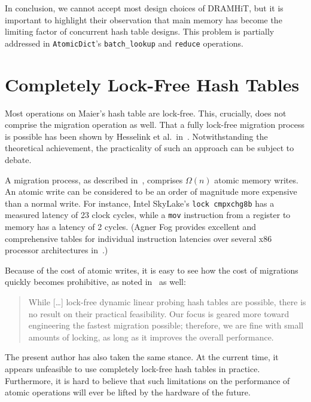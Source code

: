In conclusion, we cannot accept most design choices of DRAMHiT, but it is important to highlight their observation that main memory has become the limiting factor of concurrent hash table designs.
This problem is partially addressed in \texttt{AtomicDict}'s \texttt{{batch\_lookup}} and \texttt{reduce} operations.


\section{Completely Lock-Free Hash Tables}\label{sec:on-the-feasibility-of-completely-lock-free-hash-tables}

Most operations on Maier's hash table are lock-free.
This, crucially, does not comprise the migration operation as well.
That a fully lock-free migration process is possible has been shown by Hesselink et al.\ in~\cite[\S3.5]{hesselink}.
Notwithstanding the theoretical achievement, the practicality of such an approach can be subject to debate.

A migration process, as described in~\cite{hesselink}, comprises $\Omega(n)$ atomic memory writes.
An atomic write can be considered to be an order of magnitude more expensive than a normal write.
For instance, Intel SkyLake's \texttt{lock~cmpxchg8b} has a measured latency of 23 clock cycles, while a \texttt{mov} instruction from a register to memory has a latency of 2 cycles.
(Agner Fog provides excellent and comprehensive tables for individual instruction latencies over several x86 processor architectures in~\cite{x86-instruction-tables}.)

Because of the cost of atomic writes, it is easy to see how the cost of migrations quickly becomes prohibitive, as noted in~\cite{maier} as well:
\begin{quote}
	While [\ldots] lock-free dynamic linear probing hash tables are possible, there is no result on their practical feasibility.
	Our focus is geared more toward engineering the fastest migration possible; therefore, we are fine with small amounts of locking, as long as it improves the overall performance.
\end{quote}

The present author has also taken the same stance.
At the current time, it appears unfeasible to use completely lock-free hash tables in practice.
Furthermore, it is hard to believe that such limitations on the performance of atomic operations will ever be lifted by the hardware of the future.
